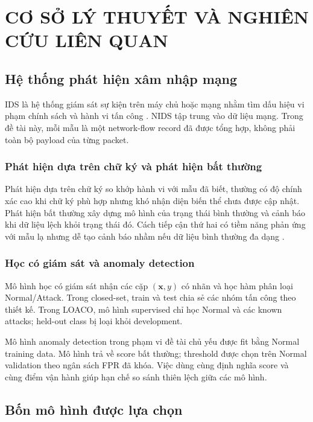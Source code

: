 \documentclass[12pt,a4paper,oneside]{report}
\begin{document}
\chapter{CƠ SỞ LÝ THUYẾT VÀ NGHIÊN CỨU LIÊN QUAN}

\section{Hệ thống phát hiện xâm nhập mạng}

IDS là hệ thống giám sát sự kiện trên máy chủ hoặc mạng nhằm tìm dấu hiệu vi phạm chính sách và hành vi tấn công \cite{nist80094}. NIDS tập trung vào dữ liệu mạng. Trong đề tài này, mỗi mẫu là một network-flow record đã được tổng hợp, không phải toàn bộ payload của từng packet.

\subsection{Phát hiện dựa trên chữ ký và phát hiện bất thường}

Phát hiện dựa trên chữ ký so khớp hành vi với mẫu đã biết, thường có độ chính xác cao khi chữ ký phù hợp nhưng khó nhận diện biến thể chưa được cập nhật. Phát hiện bất thường xây dựng mô hình của trạng thái bình thường và cảnh báo khi dữ liệu lệch khỏi trạng thái đó. Cách tiếp cận thứ hai có tiềm năng phản ứng với mẫu lạ nhưng dễ tạo cảnh báo nhầm nếu dữ liệu bình thường đa dạng \cite{chandola2009}.

\subsection{Học có giám sát và anomaly detection}

Mô hình học có giám sát nhận các cặp $(\mathbf{x},y)$ có nhãn và học hàm phân loại Normal/Attack. Trong closed-set, train và test chia sẻ các nhóm tấn công theo thiết kế. Trong LOACO, mô hình supervised chỉ học Normal và các known attacks; held-out class bị loại khỏi development.

Mô hình anomaly detection trong phạm vi đề tài chủ yếu được fit bằng Normal training data. Mô hình trả về score bất thường; threshold được chọn trên Normal validation theo ngân sách FPR đã khóa. Việc dùng cùng định nghĩa score và cùng điểm vận hành giúp hạn chế so sánh thiên lệch giữa các mô hình.

\section{Bốn mô hình được lựa chọn}
\end{document}
